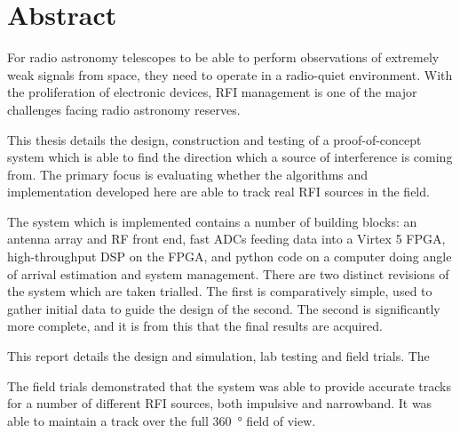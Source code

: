 \chapter{Abstract}

For radio astronomy telescopes to be able to perform observations of extremely weak signals from space, they need to operate in a radio-quiet environment. With the proliferation of electronic devices, RFI management is one of the major challenges facing radio astronomy reserves. 

This thesis details the design, construction and testing of a proof-of-concept system which is able to find the direction which a source of interference is coming from. The primary focus is evaluating whether the algorithms and implementation developed here are able to track real RFI sources in the field.

The system which is implemented contains a number of building blocks: an antenna array and RF front end, fast ADCs feeding data into a Virtex 5 FPGA, high-throughput DSP on the FPGA, and python code on a computer doing angle of arrival estimation and system management. 
There are two distinct revisions of the system which are taken trialled. The first is comparatively simple, used to gather initial data to guide the design of the second. The second is significantly more complete, and it is from this that the final results are acquired.

This report details the design and simulation, lab testing and field trials. The

The field trials demonstrated that the system was able to provide accurate tracks for a number of different RFI sources, both impulsive and narrowband. It was able to maintain a track over the full \SI{360}{\degree} field of view.
